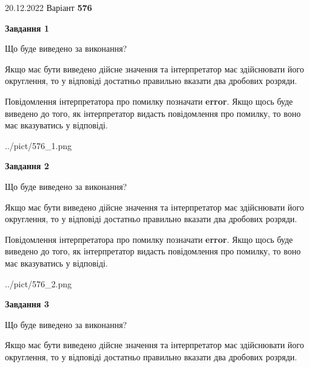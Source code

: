\documentclass[12pt, ukrainian]{article}
\begin{document}
{20.12.2022 Варіант \No \textbf { 576 }\par}
{
\begin {Large}

{\begin {center}\textbf{Завдання 1}\end {center}}\par
Що буде виведено за виконання? \par

Якщо має бути виведено дійсне значення та інтерпретатор має здійснювати його округлення, 
то у відповіді достатньо правильно вказати два дробових розряди.

Повідомлення інтерпретатора про помилку позначати \textbf{error}.
Якщо щось буде виведено до того, як інтерпретатор видасть повідомлення про помилку, 
то воно має вказуватись у відповіді. \par

\begin{center}
	{../pict/576_1.png}
\end{center}
\newpage

{\begin {center}\textbf{Завдання 2}\end {center}}\par
Що буде виведено за виконання? \par

Якщо має бути виведено дійсне значення та інтерпретатор має здійснювати його округлення, 
то у відповіді достатньо правильно вказати два дробових розряди.

Повідомлення інтерпретатора про помилку позначати \textbf{error}.
Якщо щось буде виведено до того, як інтерпретатор видасть повідомлення про помилку, 
то воно має вказуватись у відповіді. \par

\begin{center}
	{../pict/576_2.png}
\end{center}
\newpage

{\begin {center}\textbf{Завдання 3}\end {center}}\par
Що буде виведено за виконання? \par

Якщо має бути виведено дійсне значення та інтерпретатор має здійснювати його округлення, 
то у відповіді достатньо правильно вказати два дробових розряди.


\end{Large}}
\end{document}
